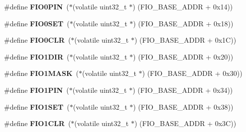 \begin{DoxyCompactItemize}
\item 
\mbox{\label{group__lpc24xx__regs_gaafe04ef1d09547bd16547b800b4df5a1}} 
\#define {\bfseries F\+I\+O0\+P\+IN}~($\ast$(volatile uint32\+\_\+t $\ast$) (F\+I\+O\+\_\+\+B\+A\+S\+E\+\_\+\+A\+D\+DR + 0x14))
\item 
\mbox{\label{group__lpc24xx__regs_gaeb77ecb736828882a0b80e33a7adf644}} 
\#define {\bfseries F\+I\+O0\+S\+ET}~($\ast$(volatile uint32\+\_\+t $\ast$) (F\+I\+O\+\_\+\+B\+A\+S\+E\+\_\+\+A\+D\+DR + 0x18))
\item 
\mbox{\label{group__lpc24xx__regs_ga32e958c8a285f756cd11f3f340f6494c}} 
\#define {\bfseries F\+I\+O0\+C\+LR}~($\ast$(volatile uint32\+\_\+t $\ast$) (F\+I\+O\+\_\+\+B\+A\+S\+E\+\_\+\+A\+D\+DR + 0x1\+C))
\item 
\mbox{\label{group__lpc24xx__regs_gaae81a3484deff18fa81de0ac8de3ab40}} 
\#define {\bfseries F\+I\+O1\+D\+IR}~($\ast$(volatile uint32\+\_\+t $\ast$) (F\+I\+O\+\_\+\+B\+A\+S\+E\+\_\+\+A\+D\+DR + 0x20))
\item 
\mbox{\label{group__lpc24xx__regs_ga13f214cea0d3f874820bd4548c46a7f0}} 
\#define {\bfseries F\+I\+O1\+M\+A\+SK}~($\ast$(volatile uint32\+\_\+t $\ast$) (F\+I\+O\+\_\+\+B\+A\+S\+E\+\_\+\+A\+D\+DR + 0x30))
\item 
\mbox{\label{group__lpc24xx__regs_gab97ddb2da2dd1db899d7b4750548f798}} 
\#define {\bfseries F\+I\+O1\+P\+IN}~($\ast$(volatile uint32\+\_\+t $\ast$) (F\+I\+O\+\_\+\+B\+A\+S\+E\+\_\+\+A\+D\+DR + 0x34))
\item 
\mbox{\label{group__lpc24xx__regs_gaa94d97e600385d0fde769e11f302cd1c}} 
\#define {\bfseries F\+I\+O1\+S\+ET}~($\ast$(volatile uint32\+\_\+t $\ast$) (F\+I\+O\+\_\+\+B\+A\+S\+E\+\_\+\+A\+D\+DR + 0x38))
\item 
\mbox{\label{group__lpc24xx__regs_gabcc77d889363cff115e5a530fa76625f}} 
\#define {\bfseries F\+I\+O1\+C\+LR}~($\ast$(volatile uint32\+\_\+t $\ast$) (F\+I\+O\+\_\+\+B\+A\+S\+E\+\_\+\+A\+D\+DR + 0x3\+C))
\item 
\mbox{\label{group__lpc24xx__regs_ga75b59afafb28de1fa7107c3db1cbfc0a}} 

\end{DoxyCompactItemize}
